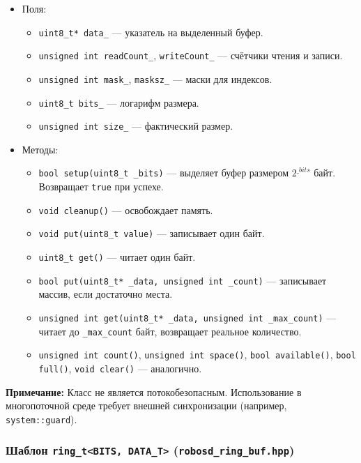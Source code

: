 \documentclass[a4paper,12pt]{article}
\begin{document}
\begin{itemize}
    \item Поля:
        \begin{itemize}
            \item \texttt{uint8\_t* data\_} — указатель на выделенный буфер.
            \item \texttt{unsigned int readCount\_}, \texttt{writeCount\_} — счётчики чтения и записи.
            \item \texttt{unsigned int mask\_}, \texttt{masksz\_} — маски для индексов.
            \item \texttt{uint8\_t bits\_} — логарифм размера.
            \item \texttt{unsigned int size\_} — фактический размер.
        \end{itemize}
    \item Методы:
        \begin{itemize}
            \item \texttt{bool setup(uint8\_t \_bits)} — выделяет буфер размером $2^{\_bits}$ байт. Возвращает \texttt{true} при успехе.
            \item \texttt{void cleanup()} — освобождает память.
            \item \texttt{void put(uint8\_t value)} — записывает один байт.
            \item \texttt{uint8\_t get()} — читает один байт.
            \item \texttt{bool put(uint8\_t* \_data, unsigned int \_count)} — записывает массив, если достаточно места.
            \item \texttt{unsigned int get(uint8\_t* \_data, unsigned int \_max\_count)} — читает до \texttt{\_max\_count} байт, возвращает реальное количество.
            \item \texttt{unsigned int count()}, \texttt{unsigned int space()}, \texttt{bool available()}, \texttt{bool full()}, \texttt{void clear()} — аналогично.
        \end{itemize}
\end{itemize}

\textbf{Примечание:} Класс не является потокобезопасным. Использование в многопоточной среде требует внешней синхронизации (например, \texttt{system::guard}).

\subsubsection{Шаблон \texttt{ring\_t<BITS, DATA\_T>} (\texttt{robosd\_ring\_buf.hpp})}
\end{document}
